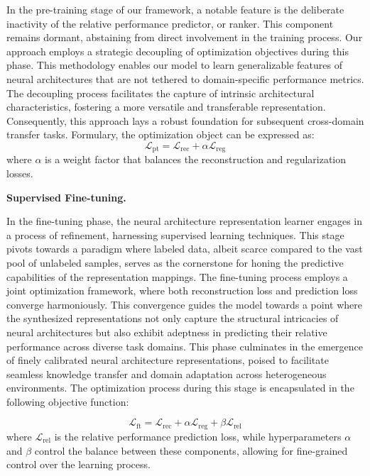 \documentclass[../main.tex]{subfiles}
\begin{document}
In the pre-training stage of our framework, a notable feature is the deliberate inactivity of the relative performance predictor, or ranker.
This component remains dormant, abstaining from direct involvement in the training process.
Our approach employs a strategic decoupling of optimization objectives during this phase.
This methodology enables our model to learn generalizable features of neural architectures that are not tethered to domain-specific performance metrics.
The decoupling process facilitates the capture of intrinsic architectural characteristics, fostering a more versatile and transferable representation.
Consequently, this approach lays a robust foundation for subsequent cross-domain transfer tasks.
Formulary, the optimization object can be expressed as:
\begin{equation}
  \mathcal{L}_\mathrm{pt} = \mathcal{L}_\mathrm{rec} + \alpha\mathcal{L}_\mathrm{reg}
\end{equation}
where \(\alpha\) is a weight factor that balances the reconstruction and regularization losses.

\textbf{Supervised Fine-tuning.}\quad

In the fine-tuning phase, the neural architecture representation learner engages in a process of refinement, harnessing supervised learning techniques. This stage pivots towards a paradigm where labeled data, albeit scarce compared to the vast pool of unlabeled samples, serves as the cornerstone for honing the predictive capabilities of the representation mappings.
The fine-tuning process employs a joint optimization framework, where both reconstruction loss and prediction loss converge harmoniously. This convergence guides the model towards a point where the synthesized representations not only capture the structural intricacies of neural architectures but also exhibit adeptness in predicting their relative performance across diverse task domains.
This phase culminates in the emergence of finely calibrated neural architecture representations, poised to facilitate seamless knowledge transfer and domain adaptation across heterogeneous environments. The optimization process during this stage is encapsulated in the following objective function:



\begin{equation}
  \mathcal{L}_\mathrm{ft} = \mathcal{L}_\mathrm{rec} + \alpha\mathcal{L}_\mathrm{reg} + \beta\mathcal{L}_\mathrm{rel}
\end{equation}
where \(\mathcal{L}_\mathrm{rel}\) is the relative performance prediction loss, while hyperparameters \(\alpha\) and \(\beta\) control the balance between these components, allowing for fine-grained control over the learning process.
\end{document}
